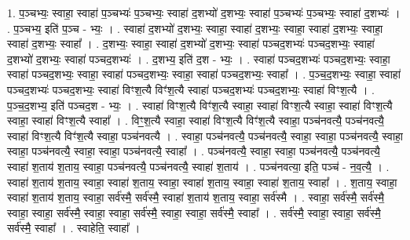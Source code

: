 \documentclass[17pt]{extarticle}
\begin{document}
1. प॒ञ्चभ्यः॒ स्वाहा॒ स्वाहा॑ प॒ञ्चभ्यः॑ प॒ञ्चभ्यः॒ स्वाहा॑ द॒शभ्यो॑ द॒शभ्यः॒ स्वाहा॑ प॒ञ्चभ्यः॑ प॒ञ्चभ्यः॒ स्वाहा॑ द॒शभ्यः॑ । . प॒ञ्चभ्य॒ इति॑ प॒ञ्च - भ्यः॒ । . स्वाहा॑ द॒शभ्यो॑ द॒शभ्यः॒ स्वाहा॒ स्वाहा॑ द॒शभ्यः॒ स्वाहा॒ स्वाहा॑ द॒शभ्यः॒ स्वाहा॒ स्वाहा॑ द॒शभ्यः॒ स्वाहा᳚ । . द॒शभ्यः॒ स्वाहा॒ स्वाहा॑ द॒शभ्यो॑ द॒शभ्यः॒ स्वाहा॑ पञ्चद॒शभ्यः॑ पञ्चद॒शभ्यः॒ स्वाहा॑ द॒शभ्यो॑ द॒शभ्यः॒ स्वाहा॑ पञ्चद॒शभ्यः॑ । . द॒शभ्य॒ इति॑ द॒श - भ्यः॒ । . स्वाहा॑ पञ्चद॒शभ्यः॑ पञ्चद॒शभ्यः॒ स्वाहा॒ स्वाहा॑ पञ्चद॒शभ्यः॒ स्वाहा॒ स्वाहा॑ पञ्चद॒शभ्यः॒ स्वाहा॒ स्वाहा॑ पञ्चद॒शभ्यः॒ स्वाहा᳚ । . प॒ञ्च॒द॒शभ्यः॒ स्वाहा॒ स्वाहा॑ पञ्चद॒शभ्यः॑ पञ्चद॒शभ्यः॒ स्वाहा॑ विꣳश॒त्यै विꣳ॑श॒त्यै स्वाहा॑ पञ्चद॒शभ्यः॑ पञ्चद॒शभ्यः॒ स्वाहा॑ विꣳश॒त्यै । . प॒ञ्च॒द॒शभ्य॒ इति॑ पञ्चद॒श - भ्यः॒ । . स्वाहा॑ विꣳश॒त्यै विꣳ॑श॒त्यै स्वाहा॒ स्वाहा॑ विꣳश॒त्यै स्वाहा॒ स्वाहा॑ विꣳश॒त्यै स्वाहा॒ स्वाहा॑ विꣳश॒त्यै स्वाहा᳚ । . विꣳ॒॒श॒त्यै स्वाहा॒ स्वाहा॑ विꣳश॒त्यै विꣳ॑श॒त्यै स्वाहा॒ पञ्च॑नवत्यै॒ पञ्च॑नवत्यै॒ स्वाहा॑ विꣳश॒त्यै विꣳ॑श॒त्यै स्वाहा॒ पञ्च॑नवत्यै । . स्वाहा॒ पञ्च॑नवत्यै॒ पञ्च॑नवत्यै॒ स्वाहा॒ स्वाहा॒ पञ्च॑नवत्यै॒ स्वाहा॒ स्वाहा॒ पञ्च॑नवत्यै॒ स्वाहा॒ स्वाहा॒ पञ्च॑नवत्यै॒ स्वाहा᳚ । . पञ्च॑नवत्यै॒ स्वाहा॒ स्वाहा॒ पञ्च॑नवत्यै॒ पञ्च॑नवत्यै॒ स्वाहा॑ श॒ताय॑ श॒ताय॒ स्वाहा॒ पञ्च॑नवत्यै॒ पञ्च॑नवत्यै॒ स्वाहा॑ श॒ताय॑ । . पञ्च॑नवत्या॒ इति॒ पञ्च॑ - न॒व॒त्यै॒ । . स्वाहा॑ श॒ताय॑ श॒ताय॒ स्वाहा॒ स्वाहा॑ श॒ताय॒ स्वाहा॒ स्वाहा॑ श॒ताय॒ स्वाहा॒ स्वाहा॑ श॒ताय॒ स्वाहा᳚ । . श॒ताय॒ स्वाहा॒ स्वाहा॑ श॒ताय॑ श॒ताय॒ स्वाहा॒ सर्व॑स्मै॒ सर्व॑स्मै॒ स्वाहा॑ श॒ताय॑ श॒ताय॒ स्वाहा॒ सर्व॑स्मै । . स्वाहा॒ सर्व॑स्मै॒ सर्व॑स्मै॒ स्वाहा॒ स्वाहा॒ सर्व॑स्मै॒ स्वाहा॒ स्वाहा॒ सर्व॑स्मै॒ स्वाहा॒ स्वाहा॒ सर्व॑स्मै॒ स्वाहा᳚ । . सर्व॑स्मै॒ स्वाहा॒ स्वाहा॒ सर्व॑स्मै॒ सर्व॑स्मै॒ स्वाहा᳚ । . स्वाहेति॒ स्वाहा᳚ । \newline
\pagebreak
{}
\end{document}
